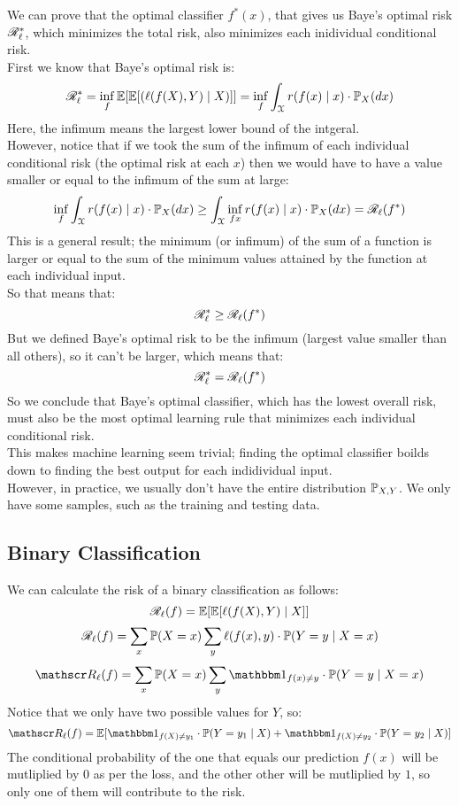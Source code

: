 \documentclass[12pt]{article}
\begin{document}
We can prove that the optimal classifier
$f^*(x)$,
that gives us Baye's optimal risk $\mathscr{R}_\ell^*$,
which minimizes the total risk,
also minimizes each inidividual conditional risk. \\
First we know that Baye's optimal risk is:
\[ \mathscr{R}_\ell^* = \inf_f 
\mathbb{E}[\mathbb{E}[(\ell(f(X), Y) \mid X)]]
= \inf_f \int_{\mathcal{X}} r(f(x) \mid x) \cdot
\mathbb{P}_X(dx) \]
Here, the infimum means the largest lower bound
of the intgeral. \\
However, notice that if we took the sum of the
infimum of each individual conditional risk
(the optimal risk at each $x$)
then we would have to have a value smaller
or equal to the infimum of the sum at large:
\[ \inf_f \int_{\mathcal{X}} r(f(x) \mid x) \cdot
\mathbb{P}_X(dx)
\geq \int_{\mathcal{X}} \inf_{fx} r(f(x) \mid x) \cdot
\mathbb{P}_X(dx) = \mathscr{R}_\ell(f^*) \]
This is a general result;
the minimum (or infimum) of the sum
of a function is larger or equal to the
sum of the minimum values attained
by the function at each individual input. \\
So that means that:
\[ \mathscr{R}_\ell^* \geq \mathscr{R}_\ell(f^*) \]
But we defined Baye's optimal risk
to be the infimum (largest value
smaller than all others),
so it can't be larger, which means that:
\[ \mathscr{R}_\ell^* = \mathscr{R}_\ell(f^*) \]
So we conclude that Baye's optimal classifier,
which has the lowest overall risk,
must also be the most optimal learning rule
that minimizes each individual conditional
risk. \\

This makes machine learning seem trivial;
finding the optimal classifier boilds
down to finding the best output for each
indidividual input. \\
However, in practice, we usually don't have
the entire distribution $\mathbb{P}_{X, Y}$.
We only have some samples, such as the training
and testing data. \\

\newpage

\subsection*{Binary Classification}

We can calculate the risk of a binary
classification as follows:
\[ \mathscr{R}_\ell(f)
= \mathbb{E}[\mathbb{E}[\ell(f(X), Y) \mid X]] \]
\[ \mathscr{R}_\ell(f)
=  \sum_x \mathbb{P}(X = x)
\sum_y \ell(f(x), y) \cdot
\mathbb{P}(Y = y \mid X = x) \]
\[ \rscr_\ell(f)
= \sum_x \pbb(X = x)
\sum_y \indicator_{f(x) \neq y}\cdot
\pbb(Y = y \mid X = x) \]
Notice that we only have two possible
values for $Y$, so:
\[ \rscr_\ell(f)
= \ebb[ \indicator_{f(X) \neq y_1}\cdot
\pbb(Y = y_1 \mid X) +
\indicator_{f(X) \neq y_2}\cdot
\pbb(Y = y_2 \mid X)] \]
The conditional probability of the one
that equals our prediction $f(x)$
will be mutliplied by $0$ as per the loss,
and the other other will be mutliplied
by $1$,
so only one of them will contribute
to the risk. \\
\end{document}
